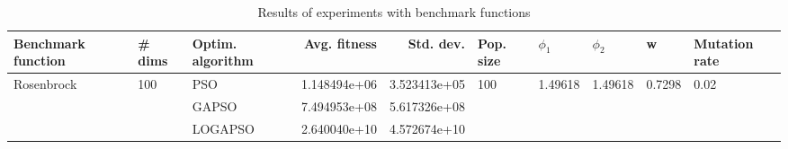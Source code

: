 \begin{table}
\centering
\caption{Results of experiments with benchmark functions}
\begin{tabular}{lllrrlllll}
\toprule
         Benchmark function &              \# dims & Optim. algorithm &  Avg. fitness &    Std. dev. &            Pop. size &               $\phi_{1}$ &               $\phi_{2}$ &                       w &         Mutation rate \\
\midrule
\multirow{3}{*}{Rosenbrock} & \multirow{3}{*}{100} &              PSO &  1.148494e+06 & 3.523413e+05 & \multirow{3}{*}{100} & \multirow{3}{*}{1.49618} & \multirow{3}{*}{1.49618} & \multirow{3}{*}{0.7298} & \multirow{3}{*}{0.02} \\
                            &                      &            GAPSO &  7.494953e+08 & 5.617326e+08 &                      &                          &                          &                         &                       \\
                            &                      &          LOGAPSO &  2.640040e+10 & 4.572674e+10 &                      &                          &                          &                         &                       \\
\bottomrule
\end{tabular}
\end{table}
